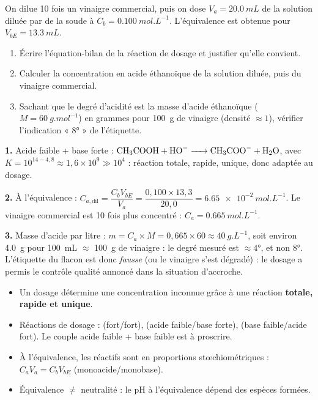 \documentclass[11pt]{article}
\newcommand{\cle}[1]{{\popxbold\color{popdark}#1}}
\begin{document}
\begin{exercice}
On dilue 10 fois un vinaigre commercial, puis on dose $V_a = \SI{20,0}{mL}$ de la solution diluée par de la soude à $C_b = \SI{0,100}{mol.L^{-1}}$. L'équivalence est obtenue pour $V_{bE} = \SI{13,3}{mL}$.
\begin{enumerate}
\item Écrire l'équation-bilan de la réaction de dosage et justifier qu'elle convient.
\item Calculer la concentration en acide éthanoïque de la solution diluée, puis du vinaigre commercial.
\item Sachant que le degré d'acidité est la masse d'acide éthanoïque ($M = \SI{60}{g.mol^{-1}}$) en grammes pour \SI{100}{g} de vinaigre (densité $\approx 1$), vérifier l'indication « 8° » de l'étiquette.
\end{enumerate}
\end{exercice}

\begin{corrige}
\textbf{1.} Acide faible + base forte : $\ce{CH3COOH + HO- -> CH3COO- + H2O}$, avec $K = 10^{14-4{,}8} \approx 1{,}6\times10^{9} \gg 10^4$ : réaction totale, rapide, unique, donc adaptée au dosage.

\textbf{2.} À l'équivalence : $C_{a,\text{dil}} = \dfrac{C_b V_{bE}}{V_a} = \dfrac{0{,}100 \times 13{,}3}{20{,}0} = \SI{6,65e-2}{mol.L^{-1}}$. Le vinaigre commercial est 10 fois plus concentré : $C_a = \SI{0,665}{mol.L^{-1}}$.

\textbf{3.} Masse d'acide par litre : $m = C_a \times M = 0{,}665 \times 60 \approx \SI{40}{g.L^{-1}}$, soit environ \SI{4,0}{g} pour \SI{100}{mL} $ \approx $ \SI{100}{g} de vinaigre : le degré mesuré est $ \approx 4° $, et non 8°. L'étiquette du flacon est donc \emph{fausse} (ou le vinaigre s'est dégradé) : le dosage a permis le contrôle qualité annoncé dans la situation d'accroche.
\end{corrige}

\begin{aretenir}
\begin{itemize}
\item Un \cle{dosage} détermine une concentration inconnue grâce à une réaction \textbf{totale, rapide et unique}.
\item Réactions de dosage :  (fort/fort),  (acide faible/base forte),  (base faible/acide fort). Le couple acide faible + base faible est à proscrire.
\item À \cle{l'équivalence}, les réactifs sont en proportions stœchiométriques : $C_a V_a = C_b V_{bE}$ (monoacide/monobase).
\item Équivalence $\neq$ neutralité : le pH à l'équivalence dépend des espèces formées.
\end{itemize}
\end{aretenir}
\end{document}
